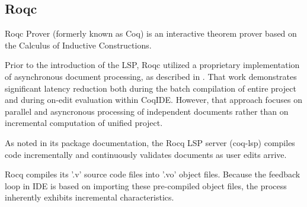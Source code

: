 \subsection{Roqc}

Roqc Prover (formerly known as Coq) is an interactive theorem prover
based on the Calculus of Inductive Constructions.

Prior to the introduction of the LSP, Roqc utilized a proprietary implementation of
asynchronous document processing, as described in \cite{barras2015asynchronousprocessingcoqdocuments}.
That work demonstrates significant latency reduction both during
the batch compilation of entire project and during on-edit evaluation within CoqIDE.
However, that approach focuses on parallel and asyncronous processing
of independent documents rather than on incremental computation of unified project.

As noted in its package documentation\cite{coq-lsp}, the Rocq LSP server (coq-lsp)
compiles code incrementally and continuously validates documents as user edits arrive.

Rocq compiles its '.v' source code files into '.vo' object files.
Because the feedback loop in IDE is based on importing these pre-compiled object files,
the process inherently exhibits incremental characteristics.

%
%
%
%
%

